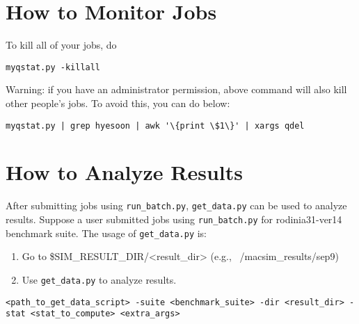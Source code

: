 \section{How to Monitor Jobs}

To kill all of your jobs, do

\begin{Verbatim}
myqstat.py -killall
\end{Verbatim}

Warning: if you have an administrator permission, above command will also kill other people's jobs. To avoid this, you can do below:

\begin{Verbatim}
myqstat.py | grep hyesoon | awk '\{print \$1\}' | xargs qdel
\end{Verbatim}

\section{How to Analyze Results}

After submitting jobs using \Verb+run_batch.py+, \Verb+get_data.py+ can be used to analyze results.
Suppose a user submitted jobs using \Verb+run_batch.py+ for rodinia31-ver14 benchmark
suite. The usage of \Verb+get_data.py+ is:

\begin{enumerate}
  \item Go to \$SIM\_RESULT\_DIR/<result\_dir> (e.g., ~/macsim\_results/sep9)
  \item Use \Verb+get_data.py+ to analyze results.
\end{enumerate}

\begin{Verbatim}
<path_to_get_data_script> -suite <benchmark_suite> -dir <result_dir> -stat <stat_to_compute> <extra_args>
\end{Verbatim}

